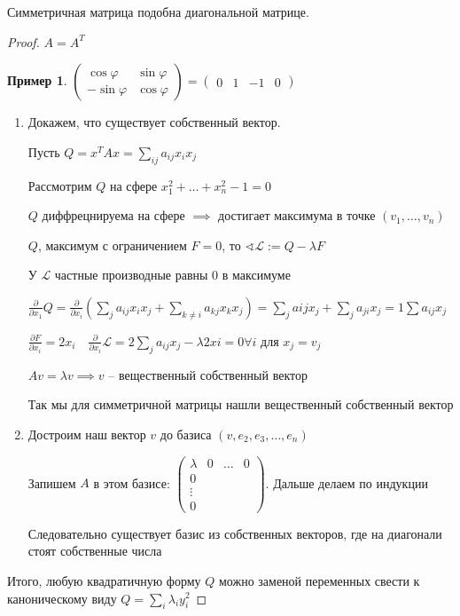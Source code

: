 \documentclass{book}
\theoremstyle{definition}
\newtheorem*{example}{Пример}
\begin{document}
        \begin{statement}
            Симметричная матрица подобна диагональной матрице.
        \end{statement}
        \begin{proof}
            $A = A^T$

             \begin{example}
                 $\begin{pmatrix} \cos \varphi & \sin \varphi\\-\sin \varphi&\cos \varphi \end{pmatrix}  = \begin{pmatrix} 0&1&-1&0 \end{pmatrix} $
            \end{example}

            \begin{enumerate}
                \item Докажем, что существует собственный вектор.

                    Пусть $Q = x^TAx = \sum_{ij}a_{ij}x_ix_j$

                    Рассмотрим  $Q$ на сфере  $x_1^2+ \ldots +x_{n} ^2 - 1 =0$

                    $Q$ диффрецнируема на сфере $\implies $ достигает максимума в точке $(v_1, \ldots, v_n)$ 

                     $Q$, максимум с ограничением  $F = 0$, то  $\sphericalangle \mathcal L:=Q - \lambda F$

                     У $\mathcal L$ частные производные равны 0 в максимуме

                     $\frac{\partial}{\partial x_1}Q = \frac{\partial}{\partial x_i}\left( \sum_j a_{ij}x_ix_j + \sum_{k\neq i} a_{kj}x_kx_j \right) = \sum_j a{ij}x_j + \sum_j a_{ji}x_j = 1\sum a_{ij}x_j $ 

                     $\frac{\partial F}{\partial x_i} = 2x_i\quad \frac{\partial}{\partial x_i}\mathcal L = 2\sum_ja_{ij}x_j - \lambda 2xi = 0 \forall i$ для $x_j=v_j$

                      $Av = \lambda v \implies v$ -- вещественный собственный вектор

                      Так мы для симметричной матрицы нашли вещественный собственный вектор
                  \item Достроим наш вектор $v$ до базиса  $(v, e_2, e_3, \ldots, e_n)$

                      Запишем $A$ в этом базисе:  $\begin{pmatrix} \lambda& 0& \ldots & 0\\0&&&\\ \vdots&&&\\0\end{pmatrix} $. Дальше делаем по индукции

                      Следовательно существует базис из собственных векторов, где на диагонали стоят собственные числа
            \end{enumerate}
            Итого, любую квадратичную форму $Q$ можно заменой переменных свести к каноническому виду  $Q = \sum_i \lambda_iy_i^2$
        \end{proof}
\end{document}
